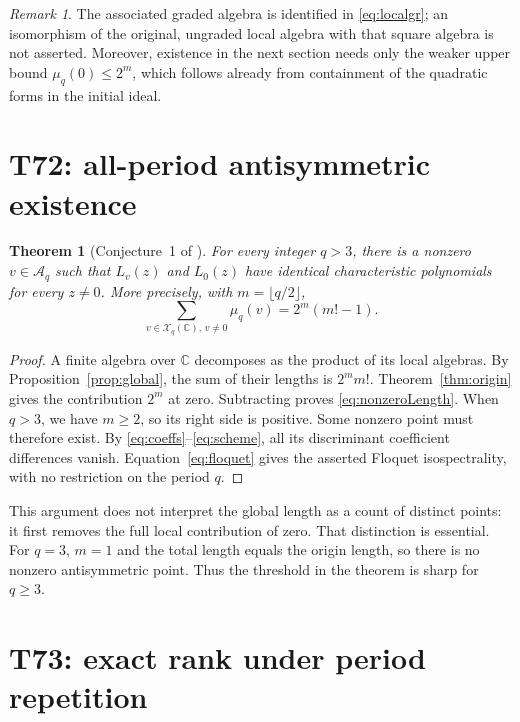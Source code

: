 \documentclass[11pt,a4paper]{article}
\newtheorem{theorem}{Theorem}
\theoremstyle{definition}
\theoremstyle{remark}
\newtheorem*{remark}{Remark}
\newcommand{\C}{\mathbb C}
\newcommand{\A}{\mathcal A}
\newcommand{\X}{\mathcal X}
\begin{document}
\begin{remark}
The associated graded algebra is identified in \eqref{eq:localgr}; an
isomorphism of the original, ungraded local algebra with that square algebra
is not asserted. Moreover, existence in the next section needs only the
weaker upper bound $\mu_q(0)\leq2^m$, which follows already from containment
of the quadratic forms in the initial ideal.
\end{remark}

\section{T72: all-period antisymmetric existence}

\begin{theorem}[Conjecture~1 of \cite{FFORS}]\label{thm:existence}
For every integer $q>3$, there is a nonzero $v\in\A_q$ such that
$L_v(z)$ and $L_0(z)$ have identical characteristic polynomials for every
$z\ne0$. More precisely, with $m=\lfloor q/2\rfloor$,
\begin{equation}\label{eq:nonzeroLength}
 \sum_{v\in\X_q(\C),\,v\ne0}\mu_q(v)=2^m(m!-1).
\end{equation}
\end{theorem}
\begin{proof}
A finite algebra over $\C$ decomposes as the product of its local algebras.
By Proposition~\ref{prop:global}, the sum of their lengths is $2^m m!$.
Theorem~\ref{thm:origin} gives the contribution $2^m$ at zero. Subtracting
proves \eqref{eq:nonzeroLength}. When $q>3$, we have $m\geq2$, so its
right side is positive. Some nonzero point must therefore exist.
By \eqref{eq:coeffs}--\eqref{eq:scheme}, all its discriminant coefficient
differences vanish. Equation~\eqref{eq:floquet} gives the asserted
Floquet isospectrality, with no restriction on the period $q$.
\end{proof}

This argument does not interpret the global length as a count of distinct
points: it first removes the full local contribution of zero. That distinction
is essential. For $q=3$, $m=1$ and the total length equals the origin length,
so there is no nonzero antisymmetric point. Thus the threshold in the theorem
is sharp for $q\geq3$.

\section{T73: exact rank under period repetition}
\end{document}
